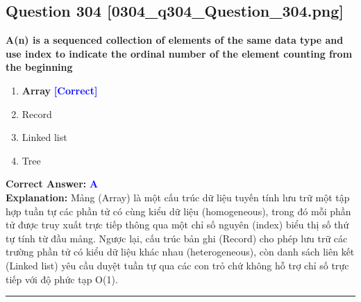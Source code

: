 \documentclass[11pt,a4paper]{article}
\begin{document}
\begin{minipage}{\textwidth}
\subsection*{Question 304 \quad \footnotesize{[0304\_q304\_Question\_304.png]}}
\noindent \textbf{A(n) is a sequenced collection of elements of the same data type and use index to indicate the ordinal number of the element counting from the beginning}

\begin{enumerate}[label=\Alph*.]
    \item \textbf{Array} \hfill \textcolor{blue}{\textbf{[Correct]}}
    \item Record
    \item Linked list
    \item Tree
\end{enumerate}

\noindent \textbf{Correct Answer:} \textcolor{blue}{\textbf{A}} \\[2pt]
\noindent \textbf{Explanation:} Mảng (Array) là một cấu trúc dữ liệu tuyến tính lưu trữ một tập hợp tuần tự các phần tử có cùng kiểu dữ liệu (homogeneous), trong đó mỗi phần tử được truy xuất trực tiếp thông qua một chỉ số nguyên (index) biểu thị số thứ tự tính từ đầu mảng. Ngược lại, cấu trúc bản ghi (Record) cho phép lưu trữ các trường phần tử có kiểu dữ liệu khác nhau (heterogeneous), còn danh sách liên kết (Linked list) yêu cầu duyệt tuần tự qua các con trỏ chứ không hỗ trợ chỉ số trực tiếp với độ phức tạp O(1).

\par\vspace{0.3cm}
\hrule
\vspace{0.3cm}
\end{minipage}
\end{document}
